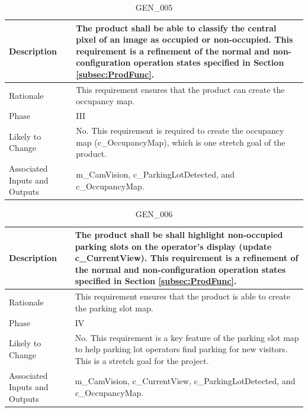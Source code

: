 \documentclass{article}
\begin{document}
\begin{table}[!h]
\begin{center}
\caption {GEN\_005} 
\label{GEN_005}
\begin{tabular}{ | m{3cm} | m{11cm} |}
\hline
Description & The product shall be able to classify the central pixel of an image as occupied or non-occupied. This requirement is a refinement of the normal and non-configuration operation states specified in Section \ref{subsec:ProdFunc}. \\
\hline
Rationale & This requirement ensures that the product can create the occupancy map. \\
\hline
Phase & III \\
\hline
Likely to Change & No. This requirement is required to create the occupancy map (c_OccupancyMap), which is one stretch goal of the product. \\
\hline
Associated Inputs and Outputs & m\_CamVision, c\_ParkingLotDetected, and c\_OccupancyMap. \\
\hline
\end{tabular}
\end{center}
\end{table}

\begin{table}[!h]
\begin{center}
\caption {GEN\_006} 
\label{GEN_006}
\begin{tabular}{ | m{3cm} | m{11cm} | }
\hline
Description & The product shall be shall highlight non-occupied parking slots on the operator's display (update c_CurrentView). This requirement is a refinement of the normal and non-configuration operation states specified in Section \ref{subsec:ProdFunc}. \\
\hline
Rationale & This requirement ensures that the product is able to create the parking slot map. \\
\hline
Phase & IV \\
\hline
Likely to Change & No. This requirement is a key feature of the parking slot map to help parking lot operators find parking for new visitors. This is a stretch goal for the project. \\
\hline
Associated Inputs and Outputs & m\_CamVision, c\_CurrentView, c\_ParkingLotDetected, and c\_OccupancyMap. \\
\hline
\end{tabular}
\end{center}
\end{table}

\clearpage
\newpage
\end{document}
